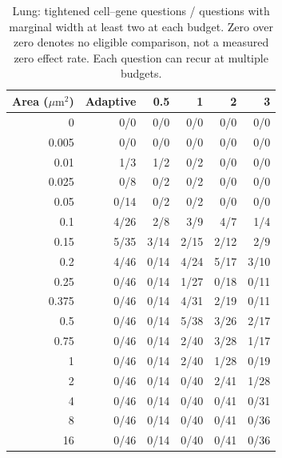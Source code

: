 \begin{table}[ht]\centering
\begin{tabular}{rrrrrr}\toprule
Area ($\mu\mathrm m^2$)&Adaptive&0.5&1&2&3\\\midrule
0 & 0/0 & 0/0 & 0/0 & 0/0 & 0/0\\
0.005 & 0/0 & 0/0 & 0/0 & 0/0 & 0/0\\
0.01 & 1/3 & 1/2 & 0/2 & 0/0 & 0/0\\
0.025 & 0/8 & 0/2 & 0/2 & 0/0 & 0/0\\
0.05 & 0/14 & 0/2 & 0/2 & 0/0 & 0/0\\
0.1 & 4/26 & 2/8 & 3/9 & 4/7 & 1/4\\
0.15 & 5/35 & 3/14 & 2/15 & 2/12 & 2/9\\
0.2 & 4/46 & 0/14 & 4/24 & 5/17 & 3/10\\
0.25 & 0/46 & 0/14 & 1/27 & 0/18 & 0/11\\
0.375 & 0/46 & 0/14 & 4/31 & 2/19 & 0/11\\
0.5 & 0/46 & 0/14 & 5/38 & 3/26 & 2/17\\
0.75 & 0/46 & 0/14 & 2/40 & 3/28 & 1/17\\
1 & 0/46 & 0/14 & 2/40 & 1/28 & 0/19\\
2 & 0/46 & 0/14 & 0/40 & 2/41 & 1/28\\
4 & 0/46 & 0/14 & 0/40 & 0/41 & 0/31\\
8 & 0/46 & 0/14 & 0/40 & 0/41 & 0/36\\
16 & 0/46 & 0/14 & 0/40 & 0/41 & 0/36\\
\bottomrule\end{tabular}
\caption{Lung: tightened cell--gene questions / questions with marginal width at least two at each budget. Zero over zero denotes no eligible comparison, not a measured zero effect rate. Each question can recur at multiple budgets.}
\end{table}
